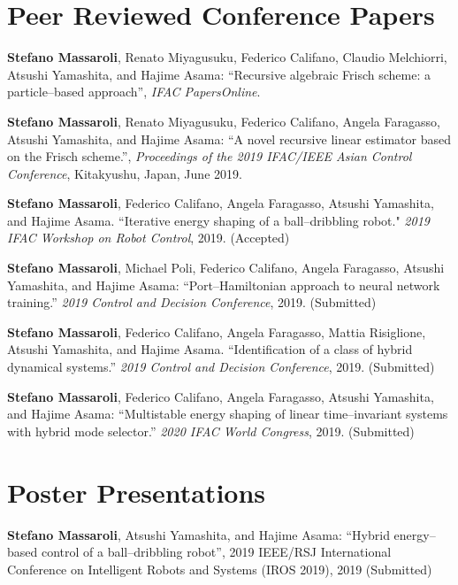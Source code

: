 \section*{Peer Reviewed Conference Papers}
\begin{enumerate}[{[}c1{]}]
\item \textbf{Stefano Massaroli}, Renato Miyagusuku, Federico Califano, Claudio Melchiorri, Atsushi Yamashita, and Hajime Asama: ``Recursive algebraic Frisch scheme: a particle--based approach'', \textit{IFAC PapersOnline}.
%
\item \textbf{Stefano Massaroli}, Renato Miyagusuku, Federico Califano, Angela Faragasso, Atsushi Yamashita, and Hajime Asama: ``A novel recursive linear estimator based on the Frisch scheme.'', \textit{Proceedings of the 2019 IFAC/IEEE Asian Control Conference}, Kitakyushu, Japan, June 2019.
%
\item \textbf{Stefano Massaroli}, Federico Califano, Angela Faragasso, Atsushi Yamashita, and
Hajime Asama. ``Iterative energy shaping of a ball--dribbling robot." \textit{2019 IFAC Workshop on Robot Control}, 2019. (Accepted)
%
\item \textbf{Stefano Massaroli}, Michael Poli, Federico Califano, Angela Faragasso, Atsushi Yamashita, and Hajime Asama: ``Port--Hamiltonian approach to neural network training.'' \textit{2019 Control and Decision Conference}, 2019. (Submitted)
%
\item \textbf{Stefano Massaroli}, Federico Califano, Angela Faragasso, Mattia Risiglione, Atsushi
Yamashita, and Hajime Asama. ``Identification of a class of hybrid dynamical systems.'' \textit{2019 Control and Decision Conference}, 2019. (Submitted)
%
\item \textbf{Stefano Massaroli}, Federico Califano, Angela Faragasso, Atsushi Yamashita, and Hajime Asama: ``Multistable energy shaping of linear time--invariant systems with hybrid mode selector.'' \textit{2020 IFAC World Congress}, 2019. (Submitted)
%
\end{enumerate}

\section*{Poster Presentations}
\begin{enumerate}[{[}p1{]}]
\item \textbf{Stefano Massaroli}, Atsushi Yamashita, and Hajime Asama: ``Hybrid energy--based control of a ball--dribbling robot'', 2019 IEEE/RSJ International Conference on Intelligent Robots and Systems (IROS 2019), 2019 (Submitted)%
\end{enumerate}

